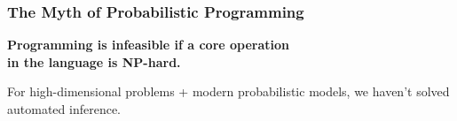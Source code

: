 \documentclass[10pt,
               xcolor={usenames,dvipsnames},
               hyperref={colorlinks,linktoc=all,citecolor=Plum,linkcolor=MidnightBlue,urlcolor=MidnightBlue},noamssymb]{beamer}
\begin{document}
\begin{frame}
\end{frame}


\begin{frame}[t]
\frametitle{The Myth of Probabilistic Programming}
\vspace{16ex}

\begin{center}
{\Large
\bf
Programming is infeasible if a core operation \\[1.25ex]
in the language is
NP-hard.
}
\end{center}

\vspace{16ex}
For high-dimensional problems + modern probabilistic models, we
haven't solved automated inference.
\end{frame}
\end{document}
